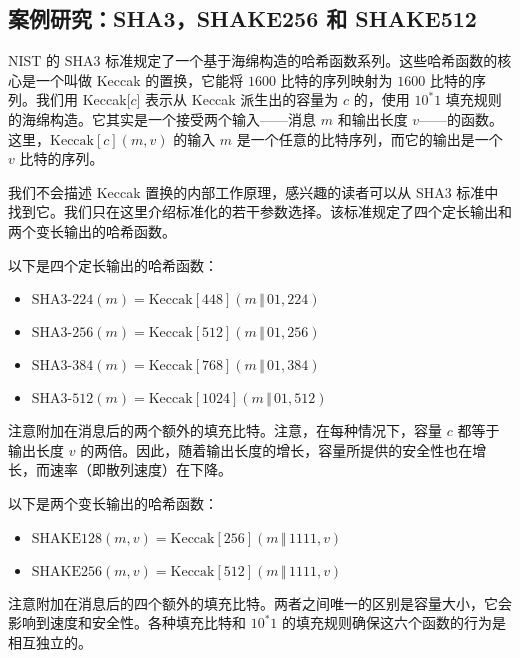 \subsection{案例研究：SHA3，SHAKE256 和 SHAKE512}\label{subsec:8-8-2}

NIST 的 SHA3 标准规定了一个基于海绵构造的哈希函数系列。这些哈希函数的核心是一个叫做 Keccak 的置换，它能将 $1600$ 比特的序列映射为 $1600$ 比特的序列。我们用 Keccak[$c$] 表示从 Keccak 派生出的容量为 $c$ 的，使用 $10^*1$ 填充规则的海绵构造。它其实是一个接受两个输入——消息 $m$ 和输出长度 $v$——的函数。这里，$\mathrm{Keccak}[c](m,v)$ 的输入 $m$ 是一个任意的比特序列，而它的输出是一个 $v$ 比特的序列。

我们不会描述 Keccak 置换的内部工作原理，感兴趣的读者可以从 SHA3 标准中找到它。我们只在这里介绍标准化的若干参数选择。该标准规定了四个定长输出和两个变长输出的哈希函数。

以下是四个定长输出的哈希函数：
\begin{itemize}
	\item $\mathrm{SHA3}\text{-}224(m)=\mathrm{Keccak}[448](m\,\Vert\,01,224)$
	\item $\mathrm{SHA3}\text{-}256(m)=\mathrm{Keccak}[512](m\,\Vert\,01,256)$
	\item $\mathrm{SHA3}\text{-}384(m)=\mathrm{Keccak}[768](m\,\Vert\,01,384)$
	\item $\mathrm{SHA3}\text{-}512(m)=\mathrm{Keccak}[1024](m\,\Vert\,01,512)$
\end{itemize}
注意附加在消息后的两个额外的填充比特。注意，在每种情况下，容量 $c$ 都等于输出长度 $v$ 的两倍。因此，随着输出长度的增长，容量所提供的安全性也在增长，而速率（即散列速度）在下降。

以下是两个变长输出的哈希函数：
\begin{itemize}
	\item $\mathrm{SHAKE128}(m,v)=\mathrm{Keccak}[256](m\,\Vert\,1111,v)$
	\item $\mathrm{SHAKE256}(m,v)=\mathrm{Keccak}[512](m\,\Vert\,1111,v)$
\end{itemize}

注意附加在消息后的四个额外的填充比特。两者之间唯一的区别是容量大小，它会影响到速度和安全性。各种填充比特和 $10^*1$ 的填充规则确保这六个函数的行为是相互独立的。
